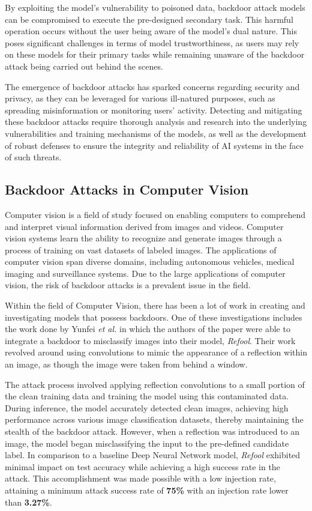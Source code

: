 By exploiting the model's vulnerability to poisoned data, backdoor attack models can be compromised to execute the pre-designed secondary task. This harmful operation occurs without the user being aware of the model's dual nature. This poses significant challenges in terms of model trustworthiness, as users may rely on these models for their primary tasks while remaining unaware of the backdoor attack being carried out behind the scenes.

The emergence of backdoor attacks has sparked concerns regarding security and privacy, as they can be leveraged for various ill-natured purposes, such as spreading misinformation or monitoring users' activity. Detecting and mitigating these backdoor attacks require thorough analysis and research into the underlying vulnerabilities and training mechanisms of the models, as well as the development of robust defenses to ensure the integrity and reliability of AI systems in the face of such threats.

\subsection{Backdoor Attacks in Computer Vision}

Computer vision is a field of study focused on enabling computers to comprehend and interpret visual information derived from images and videos. Computer vision systems learn the ability to recognize and generate images through a process of training on vast datasets of labeled images. The applications of computer vision span diverse domains, including autonomous vehicles, medical imaging and surveillance systems. Due to the large applications of computer vision, the risk of backdoor attacks is a prevalent issue in the field.

Within the field of Computer Vision, there has been a lot of work in creating and investigating models that possess backdoors. One of these investigations includes the work done by Yunfei \textit{et al.} \cite{DBLP:2007.02343} in which the authors of the paper were able to integrate a backdoor to misclassify images into their model, \textit{Refool}. Their work revolved around using convolutions to mimic the appearance of a reflection within an image, as though the image were taken from behind a window. 

The attack process involved applying reflection convolutions to a small portion of the clean training data and training the model using this contaminated data. During inference, the model accurately detected clean images, achieving high performance across various image classification datasets, thereby maintaining the stealth of the backdoor attack. However, when a reflection was introduced to an image, the model began misclassifying the input to the pre-defined candidate label. In comparison to a baseline Deep Neural Network model, \textit{Refool} exhibited minimal impact on test accuracy while achieving a high success rate in the attack. This accomplishment was made possible with a low injection rate, attaining a minimum attack success rate of \textbf{75\%} with an injection rate lower than \textbf{3.27\%}.

